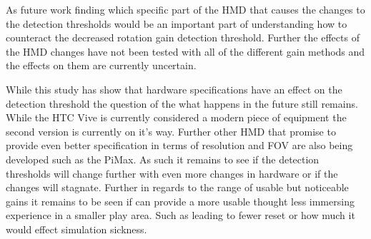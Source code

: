 
As future work finding which specific part of the HMD that causes the changes to the detection thresholds would be an important part of understanding how to counteract the decreased rotation gain detection threshold. Further the effects of the HMD changes have not been tested with all of the different gain methods and the effects on them are currently uncertain.


While this study has show that hardware specifications have an effect on the detection threshold the question of the what happens in the future still remains. While the HTC Vive is currently considered a modern piece of equipment the second version is currently on it's way. Further other HMD that promise to provide even better specification in terms of resolution and FOV are also being developed such as the PiMax. As such it remains to see if the detection thresholds will change further with even more changes in hardware or if the changes will stagnate. Further in regards to the range of usable but noticeable gains it remains to be seen if can provide a more usable thought less immersing experience in a smaller play area. Such as leading to fewer reset or how much it would effect simulation sickness.